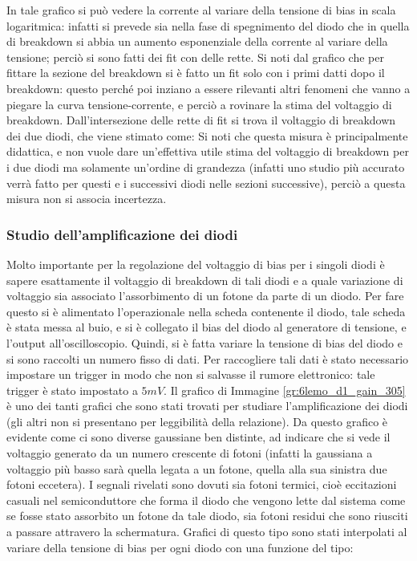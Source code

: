 In tale grafico si può vedere la corrente al variare della tensione di bias in scala logaritmica: infatti si prevede sia nella fase di spegnimento del diodo che in quella di breakdown si abbia un aumento esponenziale della corrente al variare della tensione; perciò si sono fatti dei fit con delle rette. Si noti dal grafico che per fittare la sezione del breakdown si è fatto un fit solo con i primi datti dopo il breakdown: questo perché poi inziano a essere rilevanti altri fenomeni che vanno a piegare la curva tensione-corrente, e perciò a rovinare la stima del voltaggio di breakdown.
Dall'intersezione delle rette di fit si trova il voltaggio di breakdown dei due diodi, che viene stimato come:
Si noti che questa misura è principalmente didattica, e non vuole dare un'effettiva utile stima del voltaggio di breakdown per i due diodi ma solamente un'ordine di grandezza
(infatti uno studio più accurato verrà fatto per questi e i successivi diodi nelle sezioni successive), perciò a questa misura non si associa incertezza.

\subsubsection{Studio dell'amplificazione dei diodi}
Molto importante per la regolazione del voltaggio di bias per i singoli diodi è sapere esattamente il voltaggio di breakdown di tali diodi e a quale variazione di
voltaggio sia associato l'assorbimento di un fotone da parte di un diodo. Per fare questo si è alimentato l'operazionale nella scheda contenente il diodo, tale
scheda è stata messa al buio, e si è collegato il bias del diodo al generatore di tensione, e l'output all'oscilloscopio. Quindi, si è fatta variare la tensione
di bias del diodo e si sono raccolti un numero fisso di dati. Per raccogliere tali dati è stato necessario impostare un trigger in modo che non si salvasse il rumore elettronico: tale trigger è stato impostato a $5 mV$.
Il grafico di Immagine \ref{gr:6lemo_d1_gain_305} è uno dei tanti grafici che sono stati
trovati per studiare l'amplificazione dei diodi (gli altri non si presentano per leggibilità della relazione). Da questo grafico è evidente come ci sono diverse gaussiane ben distinte, ad indicare che si vede il voltaggio
generato da un numero crescente di fotoni (infatti la gaussiana a voltaggio più basso sarà quella legata a un fotone, quella alla sua sinistra due fotoni eccetera).
I segnali rivelati sono dovuti sia fotoni termici, cioè eccitazioni casuali nel semiconduttore che forma il diodo che vengono lette dal sistema come se fosse stato assorbito un fotone
da tale diodo, sia fotoni residui che sono riusciti a passare attravero la schermatura. Grafici di questo tipo sono stati interpolati al variare della tensione di bias per ogni diodo con una funzione del tipo:


